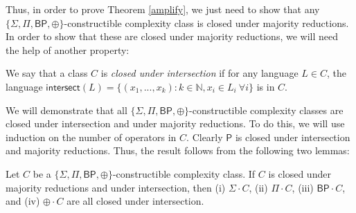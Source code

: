 \documentclass[11pt]{article}
\newcommand{\bp}{\textsf{BP}}
\newcommand{\parity}{\oplus}
\newcommand{\p}{\textsf{P}}
\newcommand{\intersection}{\textsf{intersect}}
\begin{document}
Thus, in order to prove Theorem \ref{amplify}, we just need to show that any $\{\Sigma,\Pi,\bp,\parity\}$-constructible complexity class is closed under majority reductions. In order to show that these are closed under majority reductions, we will need the help of another property:
\begin{definition}\label{defintersection}
We say that a class $C$ is \emph{closed under intersection} if for any language $L \in C$, the language $\intersection(L) = \{(x_1,...,x_k) : k\in\mathbb{N}, x_i \in L_i ~ \forall i\}$ is in $C$.
\end{definition}
We will demonstrate that all $\{\Sigma, \Pi, \bp, \parity\}$-constructible complexity classes are closed under intersection and under majority reductions. To do this, we will use induction on the number of operators in $C$. Clearly $\p$ is closed under intersection and majority reductions. Thus, the result follows from the following two lemmas:

\begin{lemma}\label{intersectionlemma}
Let $C$ be a \emph{$\{\Sigma,\Pi,\bp,\parity\}$}-constructible complexity class. If $C$ is closed under majority reductions and under intersection, then (i) \emph{$\Sigma \cdot C$}, (ii) \emph{$\Pi \cdot C$}, (iii) \emph{$\bp \cdot C$}, and (iv) \emph{$\parity \cdot C$} are all closed under intersection.
\end{lemma}
\end{document}
